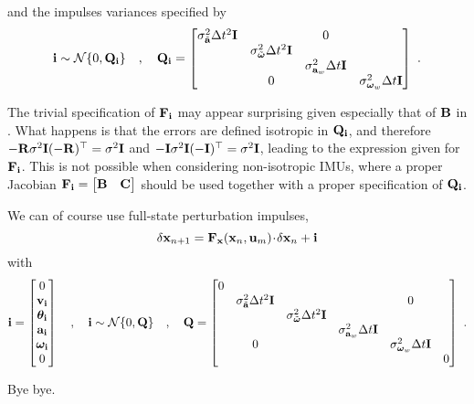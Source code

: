 %
and the impulses variances specified by
%
\begin{equation}
{\bf i} \sim \mathcal{N}\{0,{\bf Q}_{\bf i}\}
\quad,\quad
{\bf Q}_{\bf i} = \begin{bmatrix}
\sigma_{\tilde{{\bf a}}}^2\Delta t^2{\bf I} &&0&\\
& \sigma_{\tilde{{\bm \omega}}}^2\Delta t^2{\bf I} &&\\
&& \sigma_{{\bf a}_w}^2\Delta t{\bf I} &\\
&0&& \sigma_{{\bm \omega}_w}^2\Delta t{\bf I} 
\end{bmatrix}~.
\end{equation}



The trivial specification of ${\bf F}_{\bf i}$ may appear surprising given especially that of ${\bf B}$ in . 
What happens is that the errors are defined isotropic in ${\bf Q}_{\bf i}$, and therefore $-{\bf R}\sigma^2{\bf I}(-{\bf R})^{\top} = \sigma^2{\bf I}$ and $-{\bf I}\sigma^2{\bf I}(-{\bf I})^{\top} = \sigma^2{\bf I}$, leading to the expression given for ${\bf F}_{\bf i}$. 
This is not possible when considering non-isotropic IMUs, where a proper Jacobian ${\bf F}_{\bf i}=\begin{bmatrix}
{\bf B} & {\bf C}
\end{bmatrix}$ should be used together with a proper specification of ${\bf Q}_{\bf i}$.


\bigskip
We can of course use full-state perturbation impulses,
%
\begin{equation}
\delta{\bf x}_{n+1} = {\bf F}_{\bf x}({\bf x}_n, {\bf u}_m)\!\cdot\! \delta{\bf x}_n+{\bf i}
\end{equation}
%
with
%
\begin{equation}
{\bf i} = \begin{bmatrix}
0 \\
{\bf v}_{\bf i} \\
{\bm \theta}_{\bf i} \\
{\bf a}_{\bf i} \\
{\bm \omega}_{\bf i} \\
0
\end{bmatrix}
\quad,\quad
{\bf i} \sim \mathcal{N}\{0,{\bf Q}\}
\quad,\quad
{\bf Q} = \begin{bmatrix}
0 & \\
& \sigma_{\tilde{{\bf a}}}^2\Delta t^2{\bf I} &&&0&\\
&& \sigma_{\tilde{{\bm \omega}}}^2\Delta t^2{\bf I} &&\\
&&& \sigma_{{\bf a}_w}^2\Delta t{\bf I} &\\
&0&&& \sigma_{{\bm \omega}_w}^2\Delta t{\bf I} \\
&&&&&0
\end{bmatrix}~.
\end{equation}



\bigskip
\bigskip
\bigskip

Bye bye.

